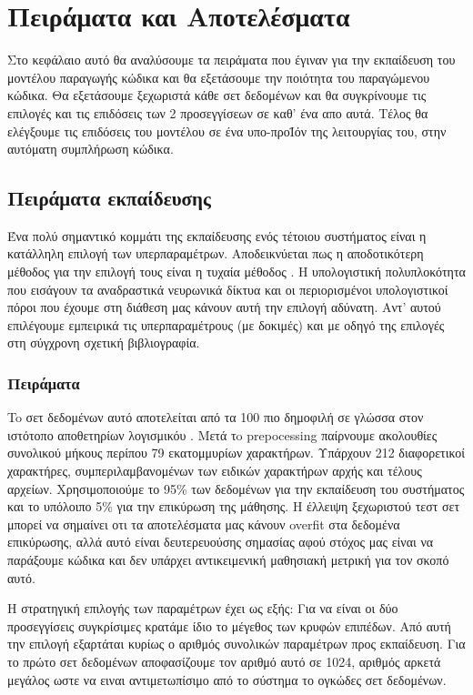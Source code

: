\chapter{Πειράματα και Αποτελέσματα}

Στο κεφάλαιο αυτό θα αναλύσουμε τα πειράματα που έγιναν για την εκπαίδευση του μοντέλου παραγωγής κώδικα και θα εξετάσουμε την ποιότητα του παραγώμενου κώδικα.
Θα εξετάσουμε ξεχωριστά κάθε σετ δεδομένων και θα συγκρίνουμε τις επιλογές και τις επιδόσεις των 2 προσεγγίσεων σε καθ' ένα απο αυτά.
Τέλος θα ελέγξουμε τις επιδόσεις του μοντέλου σε ένα υπο-προΪόν της λειτουργίας του, στην αυτόματη συμπλήρωση κώδικα.


\section{Πειράματα εκπαίδευσης}

Ένα πολύ σημαντικό κομμάτι της εκπαίδευσης ενός τέτοιου συστήματος είναι η κατάλληλη επιλογή των υπερπαραμέτρων.
Αποδεικνύεται πως η αποδοτικότερη μέθοδος για την επιλογή τους είναι η τυχαία μέθοδος \cite{Bersgstra2012}.
Η υπολογιστική πολυπλοκότητα που εισάγουν τα αναδραστικά νευρωνικά δίκτυα και οι περιορισμένοι υπολογιστικοί πόροι που έχουμε στη διάθεση μας κάνουν αυτή την επιλογή αδύνατη.
Αντ' αυτού επιλέγουμε εμπειρικά τις υπερπαραμέτρους (με δοκιμές) και με οδηγό της επιλογές στη σύγχρονη σχετική βιβλιογραφία.

\subsection{ Πειράματα}

To σετ δεδομένων αυτό αποτελείται από τα 100 πιο δημοφιλή  σε γλώσσα  στον ιστότοπο αποθετηρίων λογισμικόυ .
Μετά τo prepocessing παίρνουμε ακολουθίες συνολικού μήκους περίπου 79 εκατομμυρίων χαρακτήρων.
Υπάρχουν 212 διαφορετικοί χαρακτήρες, συμπεριλαμβανομένων των ειδικών χαρακτήρων αρχής και τέλους αρχείων.
Χρησιμοποιούμε το 95\% των δεδομένων για την εκπαίδευση του συστήματος και το υπόλοιπο 5\% για την επικύρωση της μάθησης.
Η έλλειψη ξεχωριστού τεστ σετ μπορεί να σημαίνει οτι τα αποτελέσματα μας κάνουν overfit στα δεδομένα επικύρωσης, αλλά αυτό είναι δευτερευούσης σημασίας αφού στόχος μας είναι να παράξουμε κώδικα και δεν υπάρχει αντικειμενική μαθησιακή μετρική για τον σκοπό αυτό.

Η στρατηγική επιλογής των παραμέτρων έχει ως εξής: Για να είναι οι δύο προσεγγίσεις συγκρίσιμες κρατάμε ίδιο το μέγεθος των κρυφών επιπέδων.
Από αυτή την επιλογή εξαρτάται κυρίως ο αριθμός συνολικών παραμέτρων προς εκπαίδευση.
Για το πρώτο σετ δεδομένων αποφασίζουμε τον αριθμό αυτό σε 1024, αριθμός αρκετά μεγάλος ωστε να ειναι αντιμετωπίσιμο από το σύστημα το ογκώδες σετ δεδομένων.

